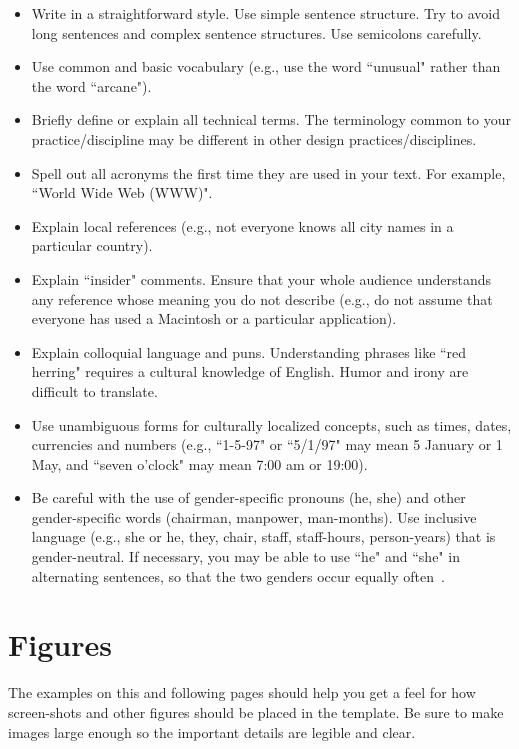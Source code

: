\documentclass{chi-ext}
\begin{document}
\begin{itemize}\compresslist
\item
Write in a straightforward style.
Use simple sentence structure.
Try to avoid long sentences and complex sentence structures.
Use semicolons carefully.
\item
Use common and basic vocabulary (e.g., use the word ``unusual" rather than the word ``arcane").
\item
Briefly define or explain all technical terms.
The terminology common to your practice/discipline may be different in other design practices/disciplines.
\item
Spell out all acronyms the first time they are used in your text.
For example, ``World Wide Web (WWW)".
\item
Explain local references (e.g., not everyone knows all city names in a particular country).
\item
Explain ``insider" comments.
Ensure that your whole audience understands any reference whose meaning you do not describe (e.g., do not assume that everyone has used a Macintosh or a particular application).
\item
Explain colloquial language and puns.
Understanding phrases like ``red herring" requires a cultural knowledge of English.
Humor and irony are difficult to translate.
\item
Use unambiguous forms for culturally localized concepts, such as times, dates, currencies and numbers (e.g., ``1-5-97" or ``5/1/97" may mean 5 January or 1 May, and ``seven o'clock" may mean 7:00 am or 19:00).
\item
Be careful with the use of gender-specific pronouns (he, she) and other gender-specific words (chairman, manpower, man-months).
Use inclusive language (e.g., she or he, they, chair, staff, staff-hours, person-years) that is gender-neutral.
If necessary, you may be able to use ``he" and ``she" in alternating sentences, so that the two genders occur equally often~\cite{Schwartz95}.
\end{itemize}


\section{Figures}
The examples on this and following pages should help you get a feel for how screen-shots and other figures should be placed in the template.
Be sure to make images large enough so the important details are legible and clear.
\end{document}
